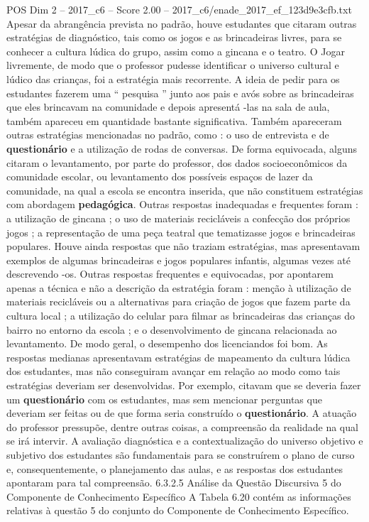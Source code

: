 \begin{textsample}{POS Dim 2 – 2017\_c6 – Score 2.00 – 2017\_c6/enade\_2017\_ef\_123d9e3cfb.txt}
Apesar da abrangência prevista no padrão, houve estudantes que citaram outras estratégias de diagnóstico, tais como os jogos e as brincadeiras livres, para se conhecer a cultura lúdica do grupo, assim como a gincana e o teatro.
O Jogar livremente, de modo que o professor pudesse identificar o universo cultural e lúdico das crianças, foi a estratégia mais recorrente.
A ideia de pedir para os estudantes fazerem uma “ pesquisa ” junto aos pais e avós sobre as brincadeiras que eles brincavam na comunidade e depois apresentá -las na sala de aula, também apareceu em quantidade bastante significativa.
Também apareceram outras estratégias mencionadas no padrão, como : o uso de entrevista e de \textbf{questionário} e a utilização de rodas de conversas.
De forma equivocada, alguns citaram o levantamento, por parte do professor, dos dados socioeconômicos da comunidade escolar, ou levantamento dos possíveis espaços de lazer da comunidade, na qual a escola se encontra inserida, que não constituem estratégias com abordagem \textbf{pedagógica}.
Outras respostas inadequadas e frequentes foram : a utilização de gincana ; o uso de materiais recicláveis a confecção dos próprios jogos ; a representação de uma peça teatral que tematizasse jogos e brincadeiras populares.
Houve ainda respostas que não traziam estratégias, mas apresentavam exemplos de algumas brincadeiras e jogos populares infantis, algumas vezes até descrevendo -os.
Outras respostas frequentes e equivocadas, por apontarem apenas a técnica e não a descrição da estratégia foram : menção à utilização de materiais recicláveis ou a alternativas para criação de jogos que fazem parte da cultura local ; a utilização do celular para filmar as brincadeiras das crianças do bairro no entorno da escola ; e o desenvolvimento de gincana relacionada ao levantamento.
De modo geral, o desempenho dos licenciandos foi bom.
As respostas medianas apresentavam estratégias de mapeamento da cultura lúdica dos estudantes, mas não conseguiram avançar em relação ao modo como tais estratégias deveriam ser desenvolvidas.
Por exemplo, citavam que se deveria fazer um \textbf{questionário} com os estudantes, mas sem mencionar perguntas que deveriam ser feitas ou de que forma seria construído o \textbf{questionário}.
A atuação do professor pressupõe, dentre outras coisas, a compreensão da realidade na qual se irá intervir.
A avaliação diagnóstica e a contextualização do universo objetivo e subjetivo dos estudantes são fundamentais para se construírem o plano de curso e, consequentemente, o planejamento das aulas, e as respostas dos estudantes apontaram para tal compreensão. 6.3.2.5 Análise da Questão Discursiva 5 do Componente de Conhecimento Específico A Tabela 6.20 contém as informações relativas à questão 5 do conjunto do Componente de Conhecimento Específico.

\end{textsample}
